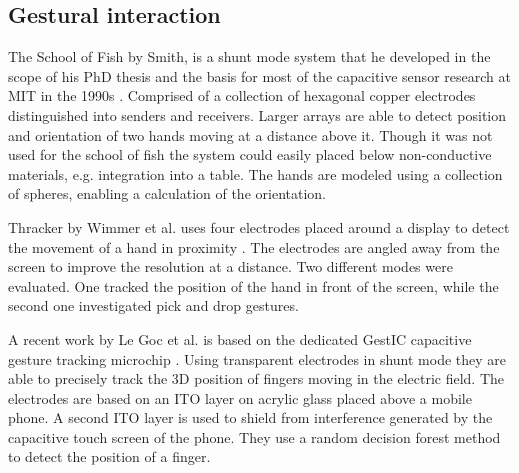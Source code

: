 \subsection{Gestural interaction}
The School of Fish by Smith, is a shunt mode system that he developed in the scope of his PhD thesis and the basis for most of the capacitive sensor research at MIT in the 1990s \cite{smith1999thesis}. Comprised of a collection of hexagonal copper electrodes distinguished into senders and receivers. Larger arrays are able to detect position and orientation of two hands moving at a distance above it. Though it was not used for the school of fish the system could easily placed below non-conductive materials, e.g. integration into a table. The hands are modeled using a collection of spheres, enabling a calculation of the orientation.

Thracker by Wimmer et al. uses four electrodes placed around a display to detect the movement of a hand in proximity \cite{Wimmer2007a}. The electrodes are angled away from the screen to improve the resolution at a distance. Two different modes were evaluated. One tracked the position of the hand in front of the screen, while the second one investigated pick and drop gestures. 

A recent work by Le Goc et al. is based on the dedicated GestIC capacitive gesture tracking microchip \cite{le2014low}. Using transparent electrodes in shunt mode they are able to precisely track the 3D position of fingers moving in the electric field. The electrodes are based on an ITO layer on acrylic glass placed above a mobile phone. A second ITO layer is used to shield from interference generated by the capacitive touch screen of the phone. They use a random decision forest method to detect the position of a finger.


 
